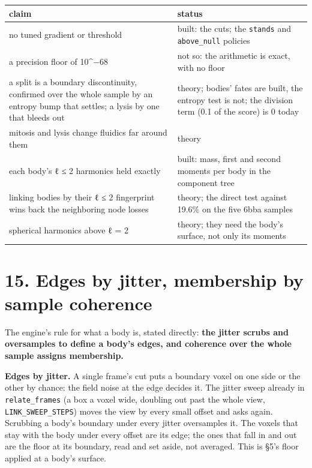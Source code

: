 {\small
\setlength{\tabcolsep}{6pt}
\begin{longtable}{>{\RaggedRight\arraybackslash}p{}>{\RaggedRight\arraybackslash}p{}}
\toprule
claim & status \\
\midrule
\endhead
no tuned gradient or threshold & built: the cuts; the \texttt{stands} and \texttt{above\_\allowbreak{}null} policies \\
a precision floor of 10\textasciicircum{}−68 & not so: the arithmetic is exact, with no floor \\
a split is a boundary discontinuity, confirmed over the whole sample by an entropy bump that settles; a lysis by one that bleeds out & theory; bodies' fates are built, the entropy test is not; the division term (0.1 of the score) is 0 today \\
mitosis and lysis change fluidics far around them & theory \\
each body's ℓ ≤ 2 harmonics held exactly & built: mass, first and second moments per body in the component tree \\
linking bodies by their ℓ ≤ 2 fingerprint wins back the neighboring node losses & theory; the direct test against 19.6\% on the five 6bba samples \\
spherical harmonics above ℓ = 2 & theory; they need the body's surface, not only its moments \\
\bottomrule
\end{longtable}
}

\section{\texorpdfstring{15. Edges by jitter, membership by sample coherence}{15. Edges by jitter, membership by sample coherence}}

The engine's rule for what a body is, stated directly: \textbf{the jitter scrubs and oversamples to define a body's edges, and coherence over the whole sample assigns membership.}

\textbf{Edges by jitter.} A single frame's cut puts a boundary voxel on one side or the other by chance: the field noise at the edge decides it. The jitter sweep already in \texttt{relate\_\allowbreak{}frames} (a box a voxel wide, doubling out past the whole view, \texttt{LINK\_\allowbreak{}SWEEP\_\allowbreak{}STEPS}) moves the view by every small offset and asks again. Scrubbing a body's boundary under every jitter oversamples it. The voxels that stay with the body under every offset are its edge; the ones that fall in and out are the floor at its boundary, read and set aside, not averaged. This is §5's floor applied at a body's surface.

